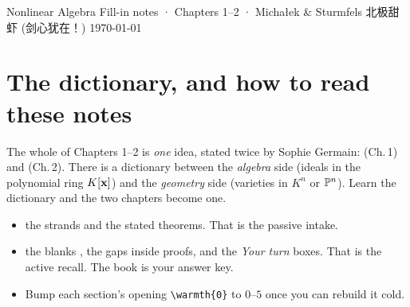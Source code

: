 \documentclass[cjk]{loomnote}   %
\begin{document}
\loomcover
  {Nonlinear Algebra}
  {Fill-in notes · Chapters 1--2 · Michałek \& Sturmfels}
  {北极甜虾 (剑心犹在！)}
  {\today}

\enablerail

\section*{The dictionary, and how to read these notes}

\begin{strand}
The whole of Chapters 1--2 is \emph{one} idea, stated twice by Sophie Germain:
 (Ch.\,1) and
 (Ch.\,2). There is a dictionary
between the \emph{algebra} side (ideals in the polynomial ring $K[\mathbf{x}]$) and the
\emph{geometry} side (varieties in $K^n$ or $\mathbb{P}^n$). Learn the dictionary and
the two chapters become one.
\end{strand}

\begin{itemize}[leftmargin=1.3em,itemsep=1pt]
  \item {} the strands and the stated theorems. That is the passive intake.
  \item {} the blanks \fillin[1.2cm], the  gaps inside proofs,
        and the \emph{Your turn} boxes. That is the active recall. The book is your answer key.
  \item Bump each section's opening \texttt{\textbackslash warmth\{0\}} to $0$--$5$ once you can rebuild it cold.
\end{itemize}
\end{document}
